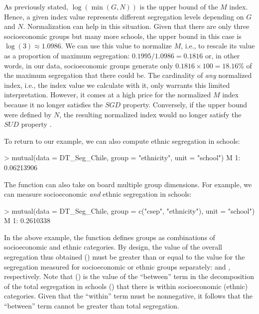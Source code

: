 As previously stated, $\log(\min(G,N))$ is the upper bound of
the $M$ index. Hence, a given index value represents different segregation
levels depending on $G$ and $N$. Normalization can help in this
situation. Given that there are only three socioeconomic groups but
many more schools, the upper bound in this case is $\log(3)\approx1.0986$.
We can use this value to normalize $M$, i.e., to rescale its value
as a proportion of maximum segregation: $0.1995/1.0986=0.1816$ or,
in other words, in our data, socioeconomic groups generate only $0.1816\times100=18.16\%$ of the maximum segregation that there could be. The cardinality of \emph{any} normalized index, i.e., the index value we calculate with it, only warrants this limited interpretation. However, it comes at a high price for the normalized $M$ index because it no longer satisfies the $SGD$ property. Conversely, if the upper bound were defined by $N$, the resulting normalized index would no longer satisfy the $SUD$ property \citep{mora2021computing}.

To return to our example, we can also compute ethnic segregation in schools:

\begin{example}
> mutual(data = DT_Seg_Chile,
         group = "ethnicity",
         unit = "school")
            M
1: 0.06213906
\end{example}

The  function can also take on board multiple group dimensions. For example, we can measure socioeconomic \textit{and} ethnic segregation in schools:
\begin{example}
> mutual(data = DT_Seg_Chile,
         group = c("csep", "ethnicity"),
         unit = "school")
           M
1: 0.2610338
\end{example}
In the above example, the  function defines groups as combinations of socioeconomic and ethnic categories.
By design, the value of the overall segregation thus obtained () must be greater than or equal to the value for the segregation measured for socioeconomic or ethnic groups separately:  and , respectively.
Note that  () is the value of the ``between'' term in the decomposition of the total segregation in schools () that there is within socioeconomic (ethnic) categories. Given that the ``within'' term must be nonnegative, it follows that the ``between'' term cannot be greater than total segregation.

